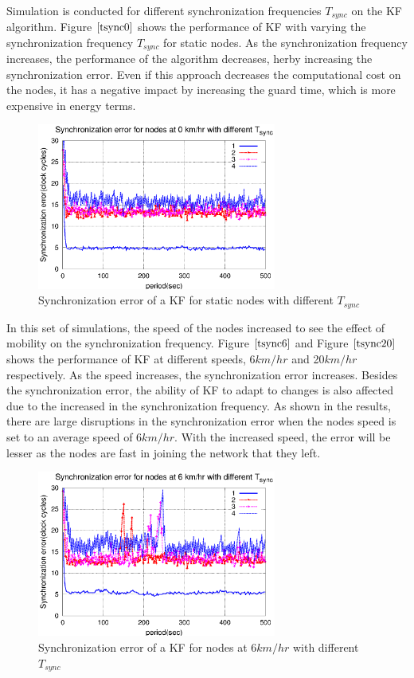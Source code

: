 \documentclass[a4paper,10pt]{report}
\begin{document}
\paragraph*{}
Simulation is conducted for different synchronization frequencies $T_{sync}$ on the KF algorithm. Figure $\ref{tsync0}$ shows the performance of KF with varying the synchronization frequency $T_{sync}$ for static nodes. As the synchronization frequency increases, the performance of the algorithm decreases, herby increasing the synchronization error. Even if this approach decreases the computational cost on the nodes, it has a negative impact by increasing the guard time, which is more expensive in energy terms.
\begin{figure}[!h]
\centering
\includegraphics[width= 0.7\textwidth]{tsync0}
\caption{Synchronization error of a KF for static nodes with different $T_{sync}$} \label{tsync0}
\end{figure}
In this set of simulations, the speed of the nodes increased to see the effect of mobility on the synchronization frequency. Figure $\ref{tsync6}$ and Figure $\ref{tsync20}$ shows the performance of KF at different speeds, 6$km/hr$ and 20$km/hr$ respectively. As the speed increases, the synchronization error increases. Besides the synchronization error, the ability of KF to adapt to changes is also affected due to the increased in the synchronization frequency. As shown in the results, there are large disruptions in the synchronization error when the nodes speed is set to an average speed of $6km/hr$. With the increased speed, the error will be lesser as the nodes are fast in joining the network that they left.  
\begin{figure}[!h]
\centering
\includegraphics[width= 0.7\textwidth]{tsync6}
\caption{Synchronization error of a KF for nodes at 6$km/hr$ with different $T_{sync}$} \label{tsync6}
\end{figure}
\end{document}
